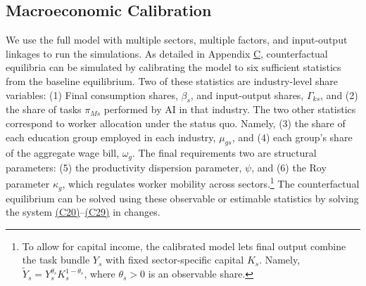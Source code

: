 \documentclass[11pt]{article}
\begin{document}
\subsection{Macroeconomic Calibration}

We use the full model with multiple sectors, multiple factors, and
input-output linkages to run the simulations. As detailed in Appendix
\href{https://ahmadlp.github.io/Lashkaripour_AI_Displacement_Online_Appendix.pdf\#page=74}{C}, counterfactual equilibria can be simulated
by calibrating the model to six sufficient statistics from the baseline
equilibrium. Two of these statistics are industry-level share variables:
(1) Final consumption shares, $\beta_{s}$, and input-output shares,
$\Gamma_{ks}$, and (2) the share of tasks $\pi_{Ms}$ performed by
AI in that industry. The two other statistics correspond to worker
allocation under the status quo. Namely, (3) the share of each education
group employed in each industry, $\mu_{gs}$, and (4) each group's
share of the aggregate wage bill, $\omega_{g}$. The final requirements
two are structural parameters: (5) the productivity dispersion parameter,
$\psi$, and (6) the Roy parameter $\kappa_{g}$, which regulates
worker mobility across sectors.\footnote{To allow for capital income, the calibrated model lets final output
combine the task bundle $Y_{s}$ with fixed sector-specific capital
$K_{s}$. Namely, $\tilde{Y}_{s}=Y^{\theta_{s}}_{s}K^{1-\theta_{s}}_{s}$,
where $\theta_{s}>0$ is an observable share.} The counterfactual equilibrium can be solved using these observable
or estimable statistics by solving the system \href{https://ahmadlp.github.io/Lashkaripour_AI_Displacement_Online_Appendix.pdf\#page=88}{(C20)}--\href{https://ahmadlp.github.io/Lashkaripour_AI_Displacement_Online_Appendix.pdf\#page=89}{(C29)}
in changes.
\end{document}
